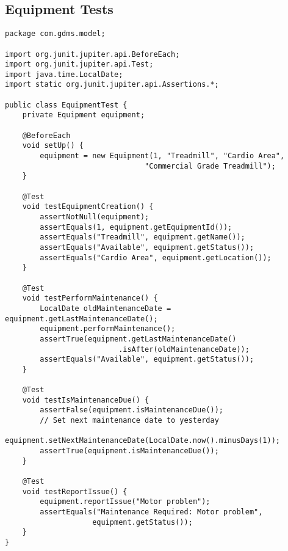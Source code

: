 \documentclass[12pt,a4paper]{report}
\begin{document}
\subsection{Equipment Tests}
\begin{lstlisting}[caption=EquipmentTest.java]
package com.gdms.model;

import org.junit.jupiter.api.BeforeEach;
import org.junit.jupiter.api.Test;
import java.time.LocalDate;
import static org.junit.jupiter.api.Assertions.*;

public class EquipmentTest {
    private Equipment equipment;

    @BeforeEach
    void setUp() {
        equipment = new Equipment(1, "Treadmill", "Cardio Area", 
                                "Commercial Grade Treadmill");
    }

    @Test
    void testEquipmentCreation() {
        assertNotNull(equipment);
        assertEquals(1, equipment.getEquipmentId());
        assertEquals("Treadmill", equipment.getName());
        assertEquals("Available", equipment.getStatus());
        assertEquals("Cardio Area", equipment.getLocation());
    }

    @Test
    void testPerformMaintenance() {
        LocalDate oldMaintenanceDate = equipment.getLastMaintenanceDate();
        equipment.performMaintenance();
        assertTrue(equipment.getLastMaintenanceDate()
                          .isAfter(oldMaintenanceDate));
        assertEquals("Available", equipment.getStatus());
    }

    @Test
    void testIsMaintenanceDue() {
        assertFalse(equipment.isMaintenanceDue());
        // Set next maintenance date to yesterday
        equipment.setNextMaintenanceDate(LocalDate.now().minusDays(1));
        assertTrue(equipment.isMaintenanceDue());
    }

    @Test
    void testReportIssue() {
        equipment.reportIssue("Motor problem");
        assertEquals("Maintenance Required: Motor problem", 
                    equipment.getStatus());
    }
}
\end{lstlisting}
\end{document}
